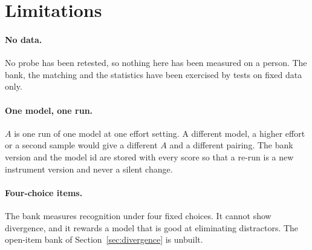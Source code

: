 \documentclass[11pt]{article}
\begin{document}
\section{Limitations}
\label{sec:limitations}

\paragraph{No data.}
No probe has been retested, so nothing here has been measured on a person. The bank, the matching and the statistics have been exercised by tests on fixed data only.

\paragraph{One model, one run.}
$A$ is one run of one model at one effort setting. A different model, a higher effort or a second sample would give a different $A$ and a different pairing. The bank version and the model id are stored with every score so that a re-run is a new instrument version and never a silent change.

\paragraph{Four-choice items.}
The bank measures recognition under four fixed choices. It cannot show divergence, and it rewards a model that is good at eliminating distractors. The open-item bank of Section~\ref{sec:divergence} is unbuilt.
\end{document}
